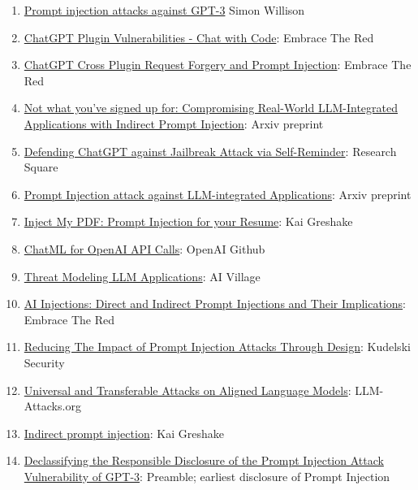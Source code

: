 \documentclass[
]{article}
\providecommand{\tightlist}{%
  \setlength{\itemsep}{0pt}\setlength{\parskip}{0pt}}
\begin{document}
\begin{enumerate}
\def\labelenumi{\arabic{enumi}.}
\tightlist
\item
  \href{https://simonwillison.net/2022/Sep/12/prompt-injection/}{Prompt
  injection attacks against GPT-3} Simon Willison
\item
  \href{https://embracethered.com/blog/posts/2023/chatgpt-plugin-vulns-chat-with-code/}{ChatGPT
  Plugin Vulnerabilities - Chat with Code}: Embrace The Red
\item
  \href{https://embracethered.com/blog/posts/2023/chatgpt-cross-plugin-request-forgery-and-prompt-injection./}{ChatGPT
  Cross Plugin Request Forgery and Prompt Injection}: Embrace The Red
\item
  \href{https://arxiv.org/pdf/2302.12173.pdf}{Not what you've signed up
  for: Compromising Real-World LLM-Integrated Applications with Indirect
  Prompt Injection}: Arxiv preprint
\item
  \href{https://www.researchsquare.com/article/rs-2873090/v1}{Defending
  ChatGPT against Jailbreak Attack via Self-Reminder}: Research Square
\item
  \href{https://arxiv.org/abs/2306.05499}{Prompt Injection attack
  against LLM-integrated Applications}: Arxiv preprint
\item
  \href{https://kai-greshake.de/posts/inject-my-pdf/}{Inject My PDF:
  Prompt Injection for your Resume}: Kai Greshake
\item
  \href{https://github.com/openai/openai-python/blob/main/chatml.md}{ChatML
  for OpenAI API Calls}: OpenAI Github
\item
  \href{http://aivillage.org/large\%20language\%20models/threat-modeling-llm/}{Threat
  Modeling LLM Applications}: AI Village
\item
  \href{https://embracethered.com/blog/posts/2023/ai-injections-direct-and-indirect-prompt-injection-basics/}{AI
  Injections: Direct and Indirect Prompt Injections and Their
  Implications}: Embrace The Red
\item
  \href{https://research.kudelskisecurity.com/2023/05/25/reducing-the-impact-of-prompt-injection-attacks-through-design/}{Reducing
  The Impact of Prompt Injection Attacks Through Design}: Kudelski
  Security
\item
  \href{https://llm-attacks.org/}{Universal and Transferable Attacks on
  Aligned Language Models}: LLM-Attacks.org
\item
  \href{https://kai-greshake.de/posts/llm-malware/}{Indirect prompt
  injection}: Kai Greshake
\item
  \href{https://www.preamble.com/prompt-injection-a-critical-vulnerability-in-the-gpt-3-transformer-and-how-we-can-begin-to-solve-it}{Declassifying
  the Responsible Disclosure of the Prompt Injection Attack
  Vulnerability of GPT-3}: Preamble; earliest disclosure of Prompt
  Injection
\end{enumerate}
\end{document}
